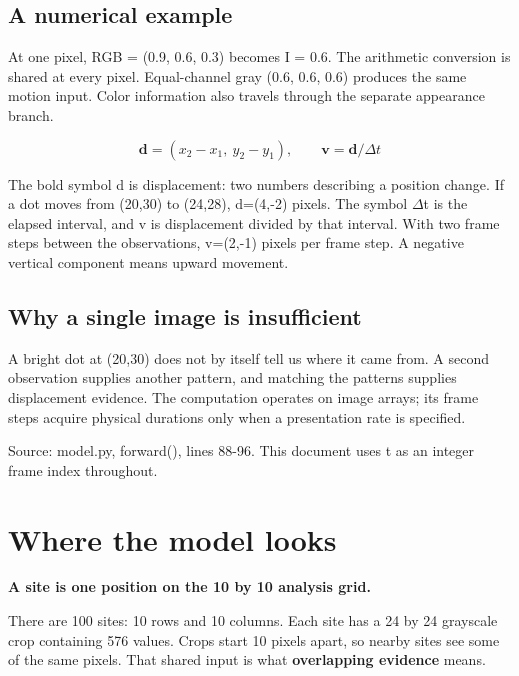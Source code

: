 \documentclass[11pt,letterpaper]{article}
\begin{document}
\subsection*{A numerical example}

At one pixel, RGB = (0.9, 0.6, 0.3) becomes I = 0.6. The arithmetic conversion is shared at every pixel. Equal-channel gray (0.6, 0.6, 0.6) produces the same motion input. Color information also travels through the separate appearance branch.


\begin{equation}\mathbf d=(x_2-x_1,\ y_2-y_1),\qquad \mathbf v=\mathbf d/\Delta t\end{equation}

The bold symbol d is displacement: two numbers describing a position change. If a dot moves from (20,30) to (24,28), d=(4,-2) pixels. The symbol \(\Delta\)t is the elapsed interval, and v is displacement divided by that interval. With two frame steps between the observations, v=(2,-1) pixels per frame step. A negative vertical component means upward movement.


\subsection*{Why a single image is insufficient}

A bright dot at (20,30) does not by itself tell us where it came from. A second observation supplies another pattern, and matching the patterns supplies displacement evidence. The computation operates on image arrays; its frame steps acquire physical durations only when a presentation rate is specified.


{
\small\color{muted} Source: model.py, forward(), lines 88-96. This document uses t as an integer frame index throughout.\par}


\clearpage

\section{Where the model looks}\label{sec2}

\textbf{A site is one position on the 10 by 10 analysis grid.}


There are 100 sites: 10 rows and 10 columns. Each site has a 24 by 24 grayscale crop containing 576 values. Crops start 10 pixels apart, so nearby sites see some of the same pixels. That shared input is what \textbf{overlapping evidence} means.
\end{document}
